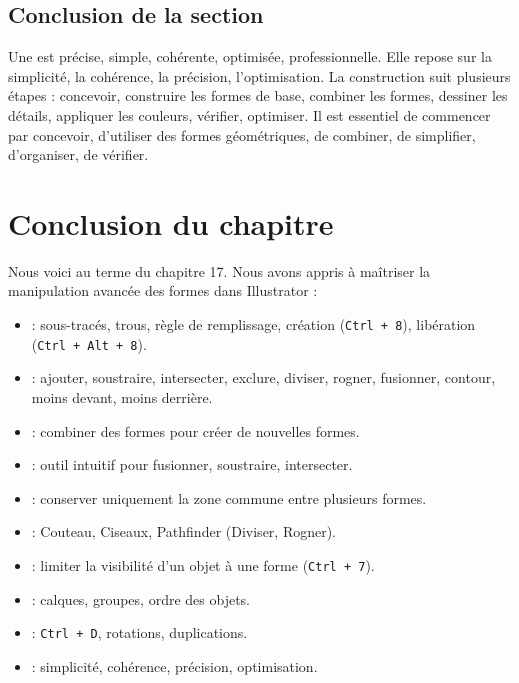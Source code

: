 \subsection*{Conclusion de la section}

Une  est précise, simple, cohérente, optimisée, professionnelle. Elle repose sur la simplicité, la cohérence, la précision, l'optimisation. La construction suit plusieurs étapes : concevoir, construire les formes de base, combiner les formes, dessiner les détails, appliquer les couleurs, vérifier, optimiser. Il est essentiel de commencer par concevoir, d'utiliser des formes géométriques, de combiner, de simplifier, d'organiser, de vérifier.

\section*{Conclusion du chapitre}

Nous voici au terme du chapitre 17. Nous avons appris à maîtriser la manipulation avancée des formes dans Illustrator :

\begin{itemize}
    \item {} : sous-tracés, trous, règle de remplissage, création (\texttt{Ctrl + 8}), libération (\texttt{Ctrl + Alt + 8}).
    \item {} : ajouter, soustraire, intersecter, exclure, diviser, rogner, fusionner, contour, moins devant, moins derrière.
    \item {} : combiner des formes pour créer de nouvelles formes.
    \item {} : outil intuitif pour fusionner, soustraire, intersecter.
    \item {} : conserver uniquement la zone commune entre plusieurs formes.
    \item {} : Couteau, Ciseaux, Pathfinder (Diviser, Rogner).
    \item {} : limiter la visibilité d'un objet à une forme (\texttt{Ctrl + 7}).
    \item {} : calques, groupes, ordre des objets.
    \item {} : \texttt{Ctrl + D}, rotations, duplications.
    \item {} : simplicité, cohérence, précision, optimisation.
\end{itemize}

